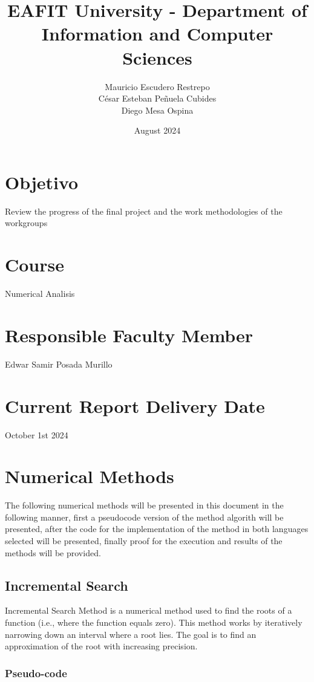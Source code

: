 \documentclass{article}
\title{EAFIT University - Department of Information and Computer Sciences}
\author{Mauricio Escudero Restrepo \\
        César Esteban Peñuela Cubides \\
        Diego Mesa Ospina}
\date{August 2024}
\begin{document}
\maketitle

\section{Objetivo}
Review the progress of the final project and the work methodologies of the workgroups

\section{Course}
Numerical Analisis

\section{Responsible Faculty Member}
Edwar Samir Posada Murillo

\section{Current Report Delivery Date}
October 1st 2024
    
\section[]{Numerical Methods}
    The following numerical methods will be presented in this document in the following manner, first a pseudocode 
    version of the method algorith will be presented, after the code for the implementation of the method in both 
    languages selected will be presented, finally proof for the execution and results of the methods will be provided.
    
    \subsection{Incremental Search}

    Incremental Search Method is a numerical method used to find the roots of a function
    (i.e., where the function equals zero).
    This method works by iteratively narrowing down an interval where a root
    lies.
    The goal is to find an approximation of the root with increasing precision.

        \subsubsection{Pseudo-code}
\end{document}
